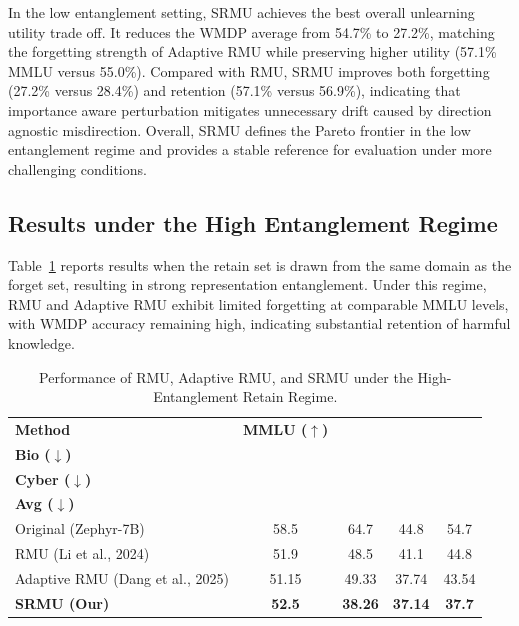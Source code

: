 In the low entanglement setting, SRMU achieves the best overall unlearning utility trade off.
It reduces the WMDP average from 54.7\% to 27.2\%, matching the forgetting strength of Adaptive RMU while preserving higher utility (57.1\% MMLU versus 55.0\%).
Compared with RMU, SRMU improves both forgetting (27.2\% versus 28.4\%) and retention (57.1\% versus 56.9\%), indicating that importance aware perturbation mitigates unnecessary drift caused by direction agnostic misdirection.
Overall, SRMU defines the Pareto frontier in the low entanglement regime and provides a stable reference for evaluation under more challenging conditions.



\subsection{Results under the High Entanglement Regime}

Table~\ref{tab:hard_regime} reports results when the retain set is drawn from the same domain as the forget set, resulting in strong representation entanglement. Under this regime, RMU and Adaptive RMU exhibit limited forgetting at comparable MMLU levels, with WMDP accuracy remaining high, indicating substantial retention of harmful knowledge.

\begin{table}[!h]
\centering
\caption{Performance of RMU, Adaptive RMU, and SRMU under the High-Entanglement Retain Regime.}
\label{tab:hard_regime}

\begin{tabular}{lcccc}
\toprule
\textbf{Method} 
& \textbf{MMLU ($\uparrow$)} 
& \makecell{\textbf{WMDP-}\\\textbf{Bio ($\downarrow$)}} 
& \makecell{\textbf{WMDP-}\\\textbf{Cyber ($\downarrow$)}} 
& \makecell{\textbf{WMDP}\\\textbf{Avg ($\downarrow$)}} \\
\midrule
Original (Zephyr-7B) & 58.5 & 64.7 & 44.8 & 54.7 \\
\midrule
RMU (Li et al., 2024) & 51.9 & 48.5 & 41.1 & 44.8 \\
Adaptive RMU (Dang et al., 2025) & 51.15 & 49.33 & 37.74 & 43.54 \\
\textbf{SRMU (Our)} & \textbf{52.5} & \textbf{38.26} & \textbf{37.14} & \textbf{37.7} \\
\bottomrule
\end{tabular}
\end{table}


